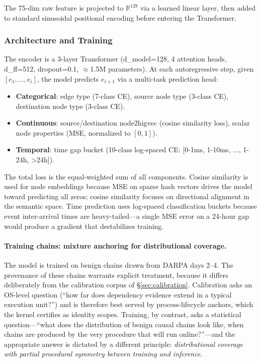 The 75-dim raw feature is projected to $\mathbb{R}^{128}$ via a learned linear layer, then added to standard sinusoidal positional encoding before entering the Transformer.

\subsubsection{Architecture and Training}

The encoder is a 3-layer Transformer (d\_model=128, 4 attention heads, d\_ff=512, dropout=0.1, $\approx$1.5M parameters). At each autoregressive step, given $[e_1, \dots, e_i]$, the model predicts $e_{i+1}$ via a multi-task prediction head:

\begin{itemize}
\item \textbf{Categorical}: edge type (7-class CE), source node type (3-class CE), destination node type (3-class CE).
\item \textbf{Continuous}: source/destination node2higvec (cosine similarity loss), scalar node properties (MSE, normalized to $[0,1]$).
\item \textbf{Temporal}: time gap bucket (10-class log-spaced CE: [0-1ms, 1-10ms, $\dots$, 1-24h, >24h]).
\end{itemize}

The total loss is the equal-weighted sum of all components. Cosine similarity is used for node embeddings because MSE on sparse hash vectors drives the model toward predicting all zeros; cosine similarity focuses on directional alignment in the semantic space. Time prediction uses log-spaced classification buckets because event inter-arrival times are heavy-tailed---a single MSE error on a 24-hour gap would produce a gradient that destabilizes training.

\paragraph{Training chains: mixture anchoring for distributional coverage.}
\label{sec:training_chains}
The model is trained on benign chains drawn from DARPA days 2--4. The provenance of these chains warrants explicit treatment, because it differs deliberately from the calibration corpus of \S\ref{sec:calibration}. Calibration asks an OS-level question (``how far does dependency evidence extend in a typical execution unit?'') and is therefore best served by process-lifecycle anchors, which the kernel certifies as identity scopes. Training, by contrast, asks a statistical question---``what does the distribution of benign causal chains look like, when chains are produced by the very procedure that will run online?''---and the appropriate answer is dictated by a different principle: \emph{distributional coverage with partial procedural symmetry between training and inference}.

